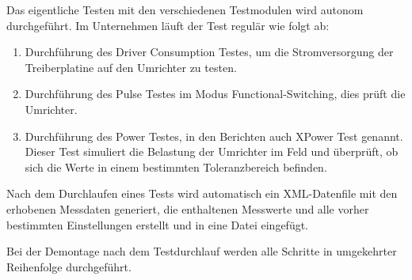 Das eigentliche Testen mit den verschiedenen Testmodulen wird autonom durchgeführt.
Im Unternehmen läuft der Test regulär wie folgt ab:
\begin{enumerate}

\item Durchführung des Driver Consumption Testes, um die Stromversorgung der Treiberplatine auf den Umrichter zu testen.
\item Durchführung des Pulse Testes im Modus Functional-Switching, dies prüft die Umrichter.
\item Durchführung des Power Testes, in den Berichten auch XPower Test genannt.
Dieser Test simuliert die Belastung der Umrichter im Feld und überprüft,
ob sich die Werte in einem bestimmten Toleranzbereich befinden.

\end{enumerate}

Nach dem Durchlaufen eines Tests wird automatisch ein XML-Datenfile mit den erhobenen Messdaten generiert,
die enthaltenen Messwerte und alle vorher bestimmten Einstellungen erstellt und in eine Datei eingefügt.

Bei der Demontage nach dem Testdurchlauf werden alle Schritte in umgekehrter Reihenfolge durchgeführt.
\pagebreak



